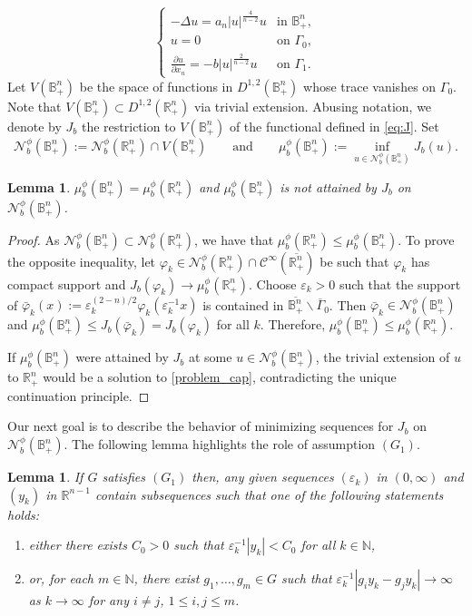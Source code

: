 \documentclass[reqno,11pt,oneside]{amsart}
\newtheorem{lemma}[theorem]{Lemma}
\numberwithin{equation}{section}
\def\D{\mathbb{B}^n_+}
\def\r{\mathbb{R}}
\def\hn{\mathbb{R}^n_+}
\def\n{\mathbb{N}}
\def\eps{\varepsilon}
\def\vp{\varphi}
\def\cC{\mathcal{C}}
\def\cN{\mathcal{N}}
\begin{document}
\begin{equation}\label{problem_d}
\begin{cases}
 -\Delta u = a_n|u|^\frac{4}{n-2}u &\text{in \ } \D,\\
 u=0 &\text{on \ }\Gamma_0,\\
\frac{\partial u}{\partial x_n} = -b|u|^\frac{2}{n-2}u &\text{on \ }\Gamma_1.
\end{cases}
\end{equation}
Let $V(\D)$ be the space of functions in $D^{1,2}(\D)$ whose trace vanishes on $\Gamma_0$. Note that $V(\D)\subset D^{1,2}(\hn)$ via trivial extension. Abusing notation, we denote by $J_b$ the restriction to $V(\D)$ of the functional defined in \eqref{eq:J}. Set
$$\cN_b^\phi(\D):=\cN_b^\phi(\hn)\cap V(\D)\qquad\text{and}\qquad \mu^\phi_b(\D):=\inf_{u\in\cN^\phi_b(\D)}J_b(u).$$

\begin{lemma} \label{lem:no_minimum}
$\mu^\phi_b(\D)=\mu^\phi_b(\hn)$ and $\mu^\phi_b(\D)$ is not attained by $J_b$ on $\cN_b^\phi(\D)$.
\end{lemma}

\begin{proof}
As $\cN_b^\phi(\D)\subset\cN_b^\phi(\hn)$, we have that $\mu^\phi_b(\hn)\leq\mu^\phi_b(\D)$. To prove the opposite inequality, let $\vp_k\in\cN_b^\phi(\hn)\cap\cC^\infty(\overline{\hn})$ be such that $\vp_k$ has compact support and $J_b(\vp_k)\to\mu^\phi_b(\hn)$. Choose $\eps_k>0$ such that the support of $\bar{\vp}_k(x):=\eps_k^{(2-n)/2}\vp_k(\eps_k^{-1}x)$ is contained in $\overline{\D}\smallsetminus\overline{\Gamma}_0$. Then $\bar{\vp}_k\in\cN_b^\phi(\D)$ and $\mu^\phi_b(\D)\leq J_b(\bar{\vp}_k)=J_b(\vp_k)$ for all $k$. Therefore, $\mu^\phi_b(\D)\leq\mu^\phi_b(\hn)$.

If $\mu^\phi_b(\D)$ were attained by $J_b$ at some $u\in\cN_b^\phi(\D)$, the trivial extension of $u$ to $\hn$ would be a solution to \eqref{problem_cap}, contradicting the unique continuation principle.
\end{proof}

Our next goal is to describe the behavior of minimizing sequences for $J_b$ on $\cN_b^\phi(\D)$. The following lemma highlights the role of assumption $(G_1)$.

\begin{lemma}\label{lem:G}
If $G$ satisfies $(G_1)$ then, any given sequences $(\eps_k)$ in $(0,\infty)$ and $(y_k)$ in $\r^{n-1}$ contain subsequences such that one of the following statements holds:
\begin{enumerate}
\item[$(i)$] either there exists $C_0>0$ such that $\eps_{k}^{-1}|y_k|<C_0$ for all $k\in\n$,
\item[$(ii)$] or, for each $m\in\n$, there exist $g_1,\ldots,g_m\in G$ such that $\eps_{k}^{-1}|g_iy_k-g_jy_k|\to\infty$ as $k\to\infty$ for any $i\neq j$, $1\leq i,j\leq m$.
\end{enumerate}
\end{lemma}
\end{document}
